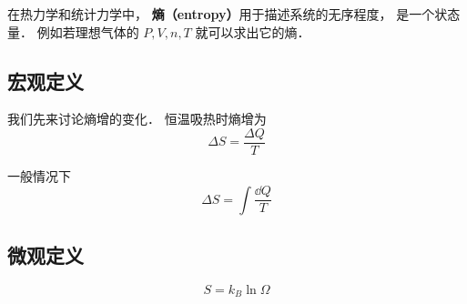 在热力学和统计力学中， \textbf{熵（entropy）}用于描述系统的无序程度， 是一个状态量． 例如若理想气体的 $P, V, n, T$ 就可以求出它的熵．

\subsection{宏观定义}

我们先来讨论熵增的变化． 恒温吸热时熵增为
\begin{equation}
\Delta S = \frac{\Delta Q}{T}
\end{equation}

一般情况下
\begin{equation}
\Delta S = \int \frac{\dd{Q}}{T}
\end{equation}

\subsection{微观定义}
\begin{equation}
S = k_B \ln \Omega
\end{equation}
